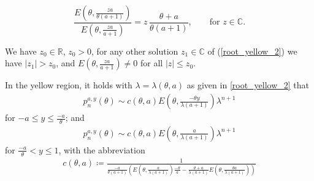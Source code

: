 \documentclass[10pt,a4paper]{amsart}
\newcommand{\C}{\mathbb{C}} %
\newcommand{\R}{\mathbb{R}} %
\begin{document}
\begin{equation}\label{root_yellow_2}
\frac{E\left(\theta,\frac{za}{\theta(a+1)}\right)}{E\left(\theta,\frac{za}{a+1}\right)} = z \,\frac{\theta+a}{\theta(a+1)},\qquad \text{for $z\in\C$}.
\end{equation}

\begin{Lemma}\label{lemma_root_yellow}
We have $z_0\in\R$, $z_0>0$, for any other solution $z_1\in\C$ of (\ref{root_yellow_2}) we have $|z_1|>z_0$, and $E(\theta,\frac{za}{a+1})\neq 0$ for all $|z|\leq z_0$.
\end{Lemma}

\begin{Lemma}\label{asymptotic_gelb_eigenfunction}
    In the yellow region, it holds with $\lambda=\lambda(\theta,a)$ as given in \eqref{root_yellow_2} that
    \begin{align*}
       p_n^{a,y}(\theta)\sim c(\theta,a)E\left(\theta,\frac{-\theta y}{\lambda(a+1)}\right)\lambda^{n+1}
   \end{align*}
   for $-a\leq y \leq \frac{-a}{\theta}$; and 
   \begin{align*}
       p_n^{a,y}(\theta)\sim c(\theta,a)E\left(\theta,\frac{a}{\lambda(a+1)}\right)\lambda^{n+1}
   \end{align*}
   for $\frac{-a}{\theta}<y\leq1$, with the abbreviation
    \begin{align*}
       c(\theta, a)\coloneqq\frac{1}{\frac{-a}{\theta(a+1)}\left(E\left(\theta,\frac{a}{\lambda(a+1)}\right)\frac{-\theta}{a}- \frac{\theta +a}{\lambda(a+1)}
        E\left(\theta,\frac{\theta a}{\lambda(a+1)}\right)\right)} %
   \end{align*}
   \end{Lemma}
\end{document}
